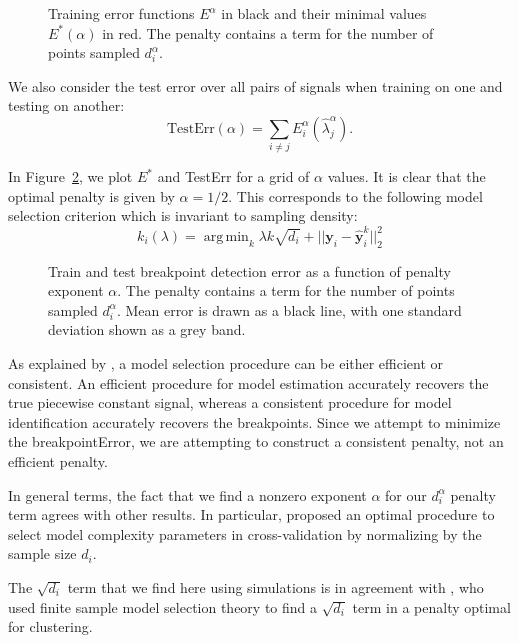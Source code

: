 \documentclass{jsfds} %
\newcommand{\fig}[3][H]{
  \begin{figure}[#1]
    \hskip -1cm
    
    \caption{#3}
    \label{fig:#2}
  \end{figure}
}
\DeclareMathOperator*{\argmin}{arg\,min}
\begin{document}
\fig{variable-density-error-train}{Training error functions $E^\alpha$
  in black and their minimal values $E^*(\alpha)$ in red. The penalty
  contains a term for the number of points sampled $d_i^\alpha$.}

\newpage

We also consider the test error over all pairs of signals when
training on one and testing on another:
\begin{equation}
  \label{eq:lerr_test}
  \text{TestErr}(\alpha) = 
  \sum_{i\neq j} E^\alpha_i(\hat \lambda_j^\alpha).
\end{equation}

In Figure~\ref{fig:variable-density-error-alpha}, we plot $E^*$ and
TestErr for a grid of $\alpha$ values.
It is clear that the optimal penalty is given by $\alpha=1/2$. This
corresponds to the following model selection criterion which is
invariant to sampling density:
\begin{equation}
  \label{eq:var_dens_opt_pen}
  k_i(\lambda) = 
  \argmin_k \lambda k \sqrt{d_i}+||\mathbf y_i-\mathbf{\hat y}_i^k||^2_2
\end{equation}

\fig{variable-density-error-alpha}{Train and test breakpoint detection
  error as a function of penalty exponent $\alpha$. The penalty
  contains a term for the number of points sampled $d_i^\alpha$. Mean
  error is drawn as a black line, with one standard deviation shown as
  a grey band.}

\newpage

As explained by \citet{sylvain-survey}, a model selection procedure
can be either efficient or consistent. An efficient procedure for
model estimation accurately recovers the true piecewise constant signal, whereas a
consistent procedure for model identification accurately recovers the
breakpoints. Since we attempt to minimize the breakpointError, we are
attempting to construct a consistent penalty, not an efficient
penalty.

In general terms, the fact that we find a nonzero exponent $\alpha$
for our $d_i^\alpha$ penalty term agrees with other results. In
particular, \citet{vfold} proposed an optimal procedure to select model
complexity parameters in cross-validation by normalizing by the sample
size $d_i$. 

The $\sqrt{d_i}$ term that we find here using simulations is in
agreement with \citet{aurelie}, who used finite sample model selection
theory to find a $\sqrt{d_i}$ term in a penalty optimal for
clustering.
\end{document}
